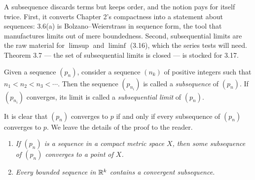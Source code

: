 
\begin{signpost}
A subsequence discards terms but keeps order, and the notion pays for itself
twice. First, it converts Chapter 2's compactness into a statement about
sequences: 3.6(a) is Bolzano--Weierstrass in sequence form, the tool that
manufactures limits out of mere boundedness. Second, subsequential limits are
the raw material for $\limsup$ and $\liminf$ (3.16), which the series tests
will need. Theorem 3.7 --- the set of subsequential limits is closed --- is
stocked for 3.17.
\end{signpost}

Given a sequence $(p_n)$, consider a sequence $(n_k)$ of positive integers
such that $n_1 < n_2 < n_3 < \cdots$. Then the sequence $(p_{n_i})$ is called a
\emph{subsequence} of $(p_n)$. If $(p_{n_i})$ converges, its limit is called a
\emph{subsequential limit} of $(p_n)$.

It is clear that $(p_n)$ converges to $p$ if and only if every subsequence of
$(p_n)$ converges to $p$. We leave the details of the proof to the
reader.

\begin{enumerate}[label=(\alph*), leftmargin=2.2em, itemsep=2pt, topsep=3pt]
  \item \emph{If $(p_n)$ is a sequence in a compact metric space $X$, then some
        subsequence of $(p_n)$ converges to a point of $X$.}
  \item \emph{Every bounded sequence in $\mathbb{R}^k$ contains a convergent
        subsequence.}
\end{enumerate}

